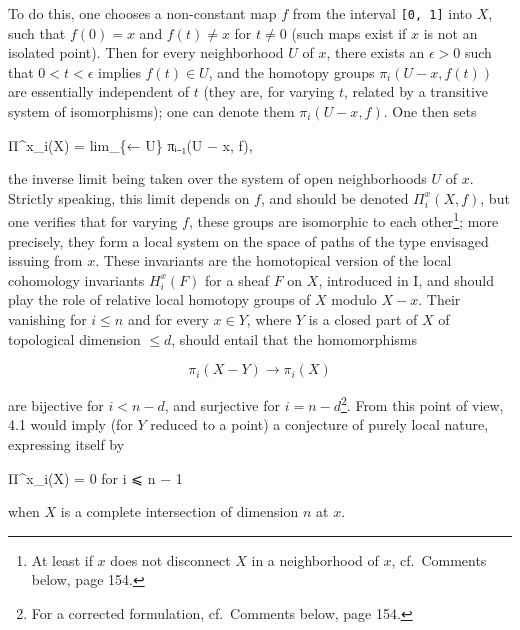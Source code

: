 \documentclass[
]{article}
\newenvironment{Shaded}{}{}
\newcommand{\NormalTok}[1]{#1}
\begin{document}
To do this, one chooses a non-constant map \(f\) from the interval
\texttt{{[}0,\ 1{]}} into \(X\), such that \(f(0) = x\) and
\(f(t) \neq x\) for \(t \neq 0\) (such maps exist if \(x\) is not an
isolated point). Then for every neighborhood \(U\) of \(x\), there
exists an \(\epsilon > 0\) such that \(0 < t < \epsilon\) implies
\(f(t) \in U\), and the homotopy groups \(\pi_{i}(U - x, f(t))\) are
essentially independent of \(t\) (they are, for varying \(t\), related
by a transitive system of isomorphisms); one can denote them
\(\pi_{i}(U - x, f)\). One then sets

\begin{Shaded}
\begin{Highlighting}[]
\NormalTok{Π\^{}x\_i(X) = lim\_\{← U\} πᵢ₋₁(U − x, f),}
\end{Highlighting}
\end{Shaded}

the inverse limit being taken over the system of open neighborhoods
\(U\) of \(x\). Strictly speaking, this limit depends on \(f\), and
should be denoted \(\Pi^{x}_{i}(X, f)\), but one verifies that for
varying \(f\), these groups are isomorphic to each other\footnote{At
  least if \(x\) does not disconnect \(X\) in a neighborhood of \(x\),
  cf.~Comments below, page 154.}; more precisely, they form a local
system on the space of paths of the type envisaged issuing from \(x\).
These invariants are the homotopical version of the local cohomology
invariants \(H^{x}_{i}(F)\) for a sheaf \(F\) on \(X\), introduced in I,
and should play the role of relative local homotopy groups of \(X\)
modulo \(X - x\). Their vanishing for \(i \leqslant n\) and for every
\(x \in Y\), where \(Y\) is a closed part of \(X\) of topological
dimension \(\leqslant d\), should entail that the homomorphisms

\[
\pi_{i}(X - Y) \to \pi_{i}(X)
\]

are bijective for \(i < n - d\), and surjective for
\(i = n - d\)\footnote{For a corrected formulation, cf.~Comments below,
  page 154.}. From this point of view, 4.1 would imply (for \(Y\)
reduced to a point) a conjecture of purely local nature, expressing
itself by

\begin{Shaded}
\begin{Highlighting}[]
\NormalTok{Π\^{}x\_i(X) = 0   for i ⩽ n − 1}
\end{Highlighting}
\end{Shaded}

when \(X\) is a complete intersection of dimension \(n\) at \(x\).
\end{document}
